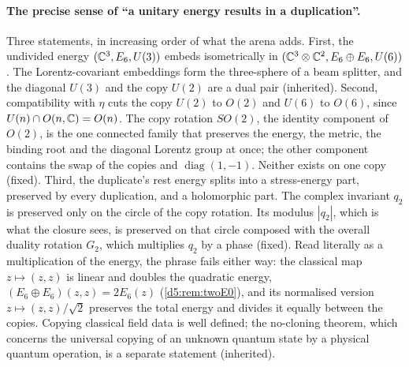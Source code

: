 \paragraph{The precise sense of ``a unitary energy results in a duplication''.} Three statements, in increasing order of what the arena adds.
First, the undivided energy $(\mathbb{C}^3,E_6,U(3))$ embeds isometrically in $(\mathbb{C}^3\otimes\mathbb{C}^2,E_6\oplus E_6,U(6))$. The Lorentz-covariant embeddings
form the three-sphere of a beam splitter, and the diagonal $U(3)$ and the copy $U(2)$ are a dual pair (inherited). Second, compatibility with
$\eta$ cuts the copy $U(2)$ to $O(2)$ and $U(6)$ to $O(6)$, since $U(n)\cap O(n,\mathbb{C})=O(n)$. The copy rotation $SO(2)$, the identity component of
$O(2)$, is the one connected family that preserves the energy, the metric, the binding root and the diagonal Lorentz group at once; the other
component contains the swap of the copies and $\operatorname{diag}(1,-1)$. Neither exists on one copy (fixed). Third, the duplicate's rest
energy splits into a stress-energy part, preserved by every duplication, and a holomorphic part. The complex invariant $q_2$ is preserved only on the circle of the copy rotation. Its modulus $|q_2|$, which is what
the closure sees, is preserved on that circle composed with the overall duality rotation $G_2$, which multiplies $q_2$ by a phase (fixed). Read literally as a multiplication of the energy, the phrase fails either way: the classical map $z\mapsto(z,z)$ is linear and doubles
the quadratic energy, $(E_6\oplus E_6)(z,z)=2E_6(z)$ (\cref{d5:rem:twoE0}), and its normalised version $z\mapsto(z,z)/\sqrt2$ preserves the total
energy and divides it equally between the copies. Copying classical field data is well defined; the no-cloning theorem, which concerns the
universal copying of an unknown quantum state by a physical quantum operation, is a separate statement (inherited).

